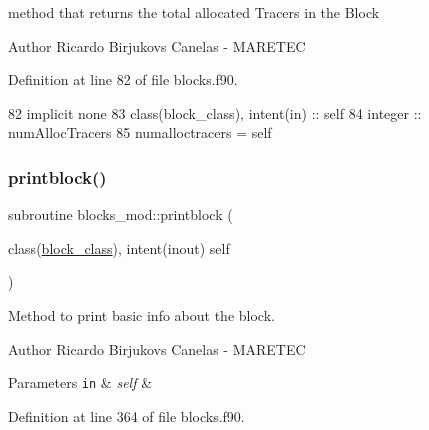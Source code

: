 method that returns the total allocated Tracers in the Block 

\begin{DoxyAuthor}{Author}
Ricardo Birjukovs Canelas -\/ M\+A\+R\+E\+T\+EC 
\end{DoxyAuthor}


Definition at line 82 of file blocks.\+f90.


\begin{DoxyCode}
82     \textcolor{keywordtype}{implicit none}
83     \textcolor{keywordtype}{class}(block\_class), \textcolor{keywordtype}{intent(in)} :: self
84     \textcolor{keywordtype}{integer} :: numAllocTracers
85     numalloctracers = self%
\end{DoxyCode}
\mbox{\label{namespaceblocks__mod_a6eab8b323cb15dcecb5c6b0c31b4e246}} 
\subsubsection{\texorpdfstring{printblock()}{printblock()}}
{\footnotesize\ttfamily subroutine blocks\+\_\+mod\+::printblock (\begin{DoxyParamCaption}\item[{class(\mbox{\hyperlink{structblocks__mod_1_1block__class}{block\+\_\+class}}), intent(inout)}]{self }\end{DoxyParamCaption})\hspace{0.3cm}{\ttfamily [private]}}



Method to print basic info about the block. 

\begin{DoxyAuthor}{Author}
Ricardo Birjukovs Canelas -\/ M\+A\+R\+E\+T\+EC 
\end{DoxyAuthor}

\begin{DoxyParams}[1]{Parameters}
\mbox{\tt in}  & {\em self} & \\
\hline
\end{DoxyParams}


Definition at line 364 of file blocks.\+f90.


